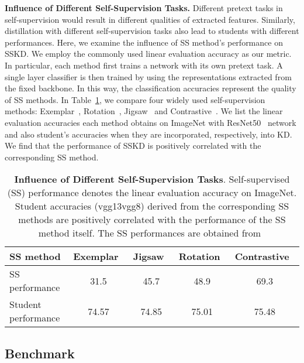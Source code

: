 \documentclass[runningheads]{llncs}
\begin{document}
\noindent
{\bf Influence of Different Self-Supervision Tasks.}
Different pretext tasks in self-supervision would result in different qualities of extracted features. Similarly, distillation with different self-supervision tasks also lead to students with different performances. Here, we examine the influence of SS method's performance on SSKD.
We employ the commonly used linear evaluation accuracy as our metric. In particular, each method first trains a network with its own pretext task. A single layer classifier is then trained by using the representations extracted from the fixed backbone. In this way, the classification accuracies represent the quality of SS methods. In Table~\ref{tab:diff_ss}, we compare four widely used self-supervision methods: Exemplar~\cite{exemplar}, Rotation~\cite{rot2}, Jigsaw~\cite{jigsaw} and Contrastive~\cite{SimCLR}. We list the linear evaluation accuracies each method obtains on ImageNet with ResNet50~\cite{resnet} network and also student's accuracies when they are incorporated, respectively, into KD. We find that the performance of SSKD is positively correlated with the corresponding SS method.

\begin{table}[t]
    \centering
    \caption{\textbf{Influence of Different Self-Supervision Tasks}. Self-supervised (SS) performance denotes the linear evaluation accuracy on ImageNet. Student accuracies (vgg13vgg8) derived from the corresponding SS methods are positively correlated with the performance of the SS method itself. The SS performances are obtained from~\cite{SimCLR,rot2,PIRL}}
    \vspace{-5pt}
    \begin{tabular}{lcccc}
    \toprule
    SS method & Exemplar~\cite{exemplar} & Jigsaw~\cite{jigsaw} & Rotation~\cite{rot2} & Contrastive~\cite{SimCLR} \\
    \midrule
    SS performance & 31.5 & 45.7 & 48.9 & 69.3 \\
    \midrule
    
    Student performance  & 74.57 & 74.85 & 75.01 & 75.48 \\
    \bottomrule
    \end{tabular}
    \label{tab:diff_ss}
    \vspace{-0.1cm}
\end{table}


\subsection{Benchmark}
\label{sec:benchmark}
\end{document}
